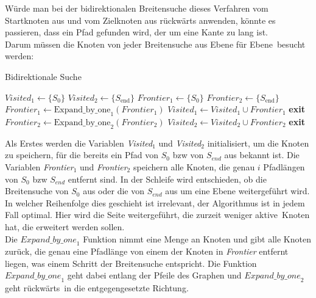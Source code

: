 \documentclass[a4paper,10pt,ngerman]{scrartcl}
\begin{document}
    Würde man bei der bidirektionalen Breitensuche dieses Verfahren vom Startknoten aus und vom Zielknoten aus rückwärts anwenden, könnte es passieren, dass ein Pfad gefunden wird, der um eine Kante zu lang ist. \\
    Darum müssen die Knoten von jeder Breitensuche aus \glqq Ebene für Ebene\grqq~besucht werden:
    \begin{algorithm}[H]
        \caption{Bidirektionale Suche}
        \label{alg:bidirectional-search}
        \begin{algorithmic}[1]
            \State $Visited_{1} \gets \{S_{0}\}$
            \State $Visited_{2} \gets \{S_{\text{end}}\}$
            \State $Frontier_{1} \gets \{S_{0}\}$
            \State $Frontier_{2} \gets \{S_{\text{end}}\}$
                    \State $Frontier_{1} \gets \text{Expand\_by\_one}_1(Frontier_{1})$
                    \State $Visited_{1} \gets Visited_{1} \cup Frontier_{1}$
                        \State \textbf{exit} 
                    \EndIf
                \Else
                    \State $Frontier_{2} \gets \text{Expand\_by\_one}_2(Frontier_{2})$
                    \State $Visited_{2} \gets Visited_{2} \cup Frontier_{2}$
                        \State \textbf{exit} 
                    \EndIf
                \EndIf
            \EndWhile
        \end{algorithmic}
    \end{algorithm}
    Als Erstes werden die Variablen \textit{Visited$_1$} und \textit{Visited$_2$} initialisiert, um die Knoten zu speichern, für die bereits ein Pfad von $S_0$ bzw von $S_{end}$ aus bekannt ist. Die Variablen \textit{Frontier$_1$} und \textit{Frontier$_2$} speichern alle Knoten, die genau $i$ Pfadlängen von $S_0$ bzw $S_{end}$ entfernt sind. In der Schleife wird entschieden, ob die Breitensuche von $S_0$ aus oder die von $S_{end}$ aus um eine Ebene weitergeführt wird. In welcher Reihenfolge dies geschieht ist irrelevant, der Algorithmus ist in jedem Fall optimal. Hier wird die Seite weitergeführt, die zurzeit weniger \glqq aktive\grqq~Knoten hat, die erweitert werden sollen.\\
    Die $\textit{Expand\_by\_one}_1$ Funktion nimmt eine Menge an Knoten und gibt alle Knoten zurück, die genau eine Pfadlänge von einem der Knoten in \textit{Frontier} entfernt liegen, was einem Schritt der Breitensuche entspricht. Die Funktion $\textit{Expand\_by\_one}_1$ geht dabei entlang der Pfeile des Graphen und $\textit{Expand\_by\_one}_2$ geht \glqq rückwärts\grqq~in die entgegengesetzte Richtung. \\
\end{document}
